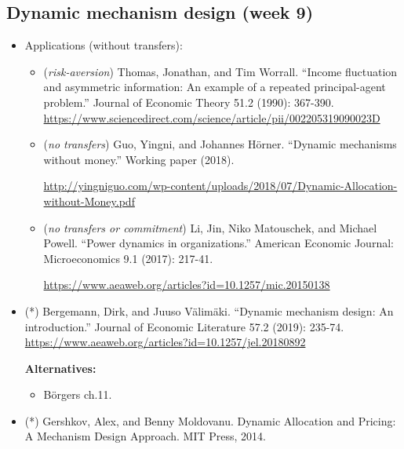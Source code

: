 \documentclass{article}
\begin{document}
\subsection{Dynamic mechanism design (week 9)}


\begin{itemize}
	\item Applications (without transfers):
	\begin{itemize}
		\item (\emph{risk-aversion}) Thomas, Jonathan, and Tim Worrall. ``Income fluctuation and asymmetric information: An example of a repeated principal-agent problem.'' Journal of Economic Theory 51.2 (1990): 367-390. \url{https://www.sciencedirect.com/science/article/pii/002205319090023D}
		\item (\emph{no transfers}) Guo, Yingni, and Johannes Hörner. ``Dynamic mechanisms without money.'' Working paper (2018). 
		
		\url{http://yingniguo.com/wp-content/uploads/2018/07/Dynamic-Allocation-without-Money.pdf}
		\item (\emph{no transfers or commitment}) Li, Jin, Niko Matouschek, and Michael Powell. ``Power dynamics in organizations.'' American Economic Journal: Microeconomics 9.1 (2017): 217-41.
		
		\url{https://www.aeaweb.org/articles?id=10.1257/mic.20150138}
	\end{itemize}
	\item (*) Bergemann, Dirk, and Juuso Välimäki. ``Dynamic mechanism design: An introduction.'' Journal of Economic Literature 57.2 (2019): 235-74. \\
	\url{https://www.aeaweb.org/articles?id=10.1257/jel.20180892}
	
	\textbf{Alternatives:}
	\begin{itemize}
		\item B{\"o}rgers ch.11.
	\end{itemize}
	\item (*) Gershkov, Alex, and Benny Moldovanu. Dynamic Allocation and Pricing: A Mechanism Design Approach. MIT Press, 2014. 
\end{itemize}
\end{document}

